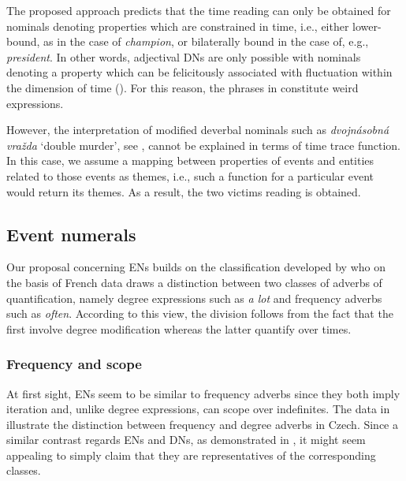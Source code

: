 \documentclass[output=paper,modfonts,hidelinks,newtxmath
\ChapterDOI{10.5281/zenodo.2545513}
]{langscibook}
\begin{document}
The proposed approach predicts that the time reading can only be obtained for nominals denoting properties which are constrained in time, i.e., either lower-bound, as in the case of \textit{champion}, or bilaterally bound in the case of, e.g., \textit{president}. In other words, adjectival DNs are only possible with nominals denoting a property which can be felicitously associated with fluctuation within the dimension of time (\citealt{wagiel2015multiplicative}). For this reason, the phrases in  constitute weird expressions.

\z

\noindent However, the interpretation of modified deverbal nominals such as \textit{dvojnásobná vražda} `double murder', see , cannot be explained in terms of time trace function. In this case, we assume a mapping between properties of events and entities related to those events as themes, i.e., such a function for a particular event would return its themes. As a result, the two victims reading is obtained.

\subsection{Event numerals}\label{event-numerals}

Our proposal concerning ENs builds on the classification developed by \cite{doetjes_adverbs_2007} who on the basis of French data draws a distinction between two classes of adverbs of quantification, namely degree expressions such as \textit{a lot} and frequency adverbs such as \textit{often}. According to this view, the division follows from the fact that the first involve degree modification whereas the latter quantify over times. 

\subsubsection{Frequency and scope}\label{frequency-and-scope}

At first sight, ENs seem to be similar to frequency adverbs since they both imply iteration and, unlike degree expressions, can scope over indefinites. The data in  illustrate the distinction between frequency and degree adverbs in Czech. Since a similar contrast regards ENs and DNs, as demonstrated in , it might seem appealing to simply claim that they are representatives of the corresponding classes.
\end{document}
